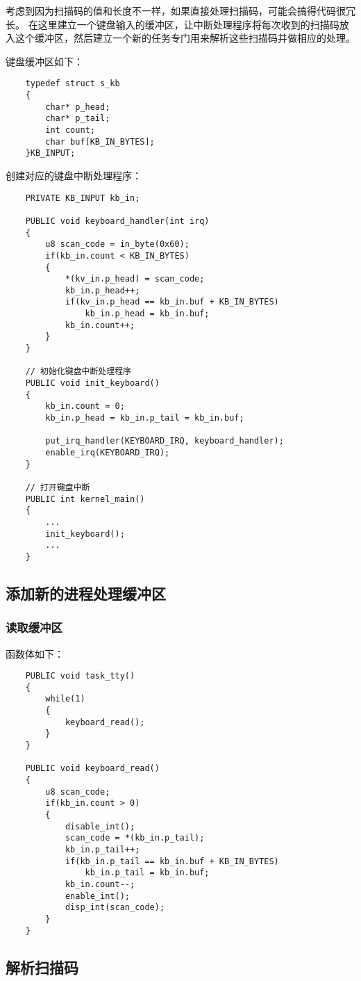 \documentclass[a4paper,left=2.5cm,right=2.5cm,11pt]{article}
\begin{document}
	考虑到因为扫描码的值和长度不一样，如果直接处理扫描码，可能会搞得代码很冗长。
	在这里建立一个键盘输入的缓冲区，让中断处理程序将每次收到的扫描码放入这个缓冲区，然后建立一个新的任务专门用来解析这些扫描码并做相应的处理。\par

	键盘缓冲区如下：
	\begin{lstlisting}
	typedef struct s_kb
	{
		char* p_head;
		char* p_tail;
		int count;
		char buf[KB_IN_BYTES];
	}KB_INPUT;	
	\end{lstlisting}

	创建对应的键盘中断处理程序：
	\begin{lstlisting}
	PRIVATE KB_INPUT kb_in;

	PUBLIC void keyboard_handler(int irq)
	{
		u8 scan_code = in_byte(0x60);
		if(kb_in.count < KB_IN_BYTES)
		{
			*(kv_in.p_head) = scan_code;
			kb_in.p_head++;
			if(kv_in.p_head == kb_in.buf + KB_IN_BYTES)
				kb_in.p_head = kb_in.buf;
			kb_in.count++;
		}
	}

	// 初始化键盘中断处理程序
	PUBLIC void init_keyboard()
	{
		kb_in.count = 0;
		kb_in.p_head = kb_in.p_tail = kb_in.buf;

		put_irq_handler(KEYBOARD_IRQ, keyboard_handler);
		enable_irq(KEYBOARD_IRQ);
	}

	// 打开键盘中断
	PUBLIC int kernel_main()
	{
		...
		init_keyboard();
		...
	}
	\end{lstlisting}

\subsection{添加新的进程处理缓冲区}
\subsubsection{读取缓冲区}
	函数体如下：
	\begin{lstlisting}
	PUBLIC void task_tty()
	{
		while(1)
		{
			keyboard_read();
		}
	}

	PUBLIC void keyboard_read()
	{
		u8 scan_code;
		if(kb_in.count > 0)
		{
			disable_int();
			scan_code = *(kb_in.p_tail);
			kb_in.p_tail++;
			if(kb_in.p_tail == kb_in.buf + KB_IN_BYTES)
				kb_in.p_tail = kb_in.buf;
			kb_in.count--;
			enable_int();
			disp_int(scan_code);
		}
	}
	\end{lstlisting}

\subsection{解析扫描码}
\end{document}
